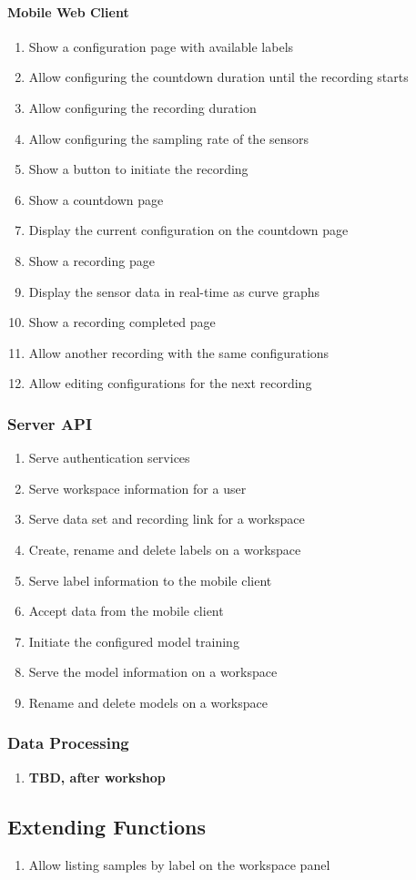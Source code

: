 \paragraph{Mobile Web Client}
\begin{enumerate}[resume*]
    \item Show a configuration page with available labels
    \item Allow configuring the countdown duration until the recording starts
    \item Allow configuring the recording duration
    \item Allow configuring the sampling rate of the sensors
    \item Show a button to initiate the recording
    \item Show a countdown page
    \item Display the current configuration on the countdown page
    \item Show a recording page
    \item Display the sensor data in real-time as curve graphs
    \item Show a recording completed page
    \item Allow another recording with the same configurations
    \item Allow editing configurations for the next recording
\end{enumerate}

\subsubsection{Server API}
\begin{enumerate}[resume*]
    \item Serve authentication services
    \item Serve workspace information for a user
    \item Serve data set and recording link for a workspace
    \item Create, rename and delete labels on a workspace
    \item Serve label information to the mobile client
    \item Accept data from the mobile client
    \item Initiate the configured model training
    \item Serve the model information on a workspace
    \item Rename and delete models on a workspace
\end{enumerate}

\subsubsection{Data Processing}
\begin{enumerate}[resume*]
    \item \textbf{TBD, after workshop}
\end{enumerate}

\subsection{Extending Functions}
\begin{enumerate}[resume*]
    \item Allow listing samples by label on the workspace panel
\end{enumerate}